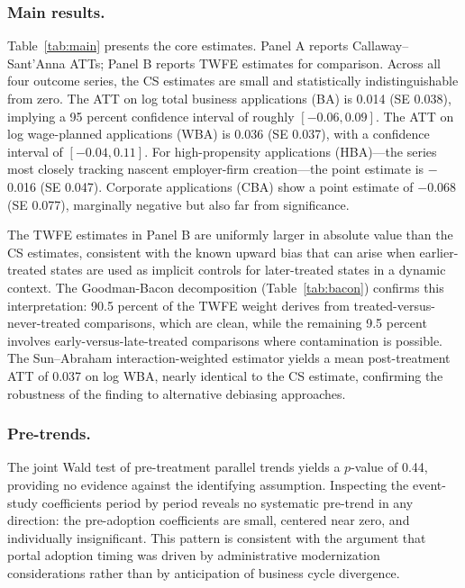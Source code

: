 \documentclass[12pt]{article}
\begin{document}
\subsubsection*{Main results.}
Table~\ref{tab:main} presents the core estimates. Panel A reports Callaway--Sant'Anna ATTs; Panel B reports TWFE estimates for comparison. Across all four outcome series, the CS estimates are small and statistically indistinguishable from zero. The ATT on log total business applications (BA) is 0.014 (SE 0.038), implying a 95 percent confidence interval of roughly $[-0.06, 0.09]$. The ATT on log wage-planned applications (WBA) is 0.036 (SE 0.037), with a confidence interval of $[-0.04, 0.11]$. For high-propensity applications (HBA)---the series most closely tracking nascent employer-firm creation---the point estimate is $-$0.016 (SE 0.047). Corporate applications (CBA) show a point estimate of $-$0.068 (SE 0.077), marginally negative but also far from significance.



The TWFE estimates in Panel B are uniformly larger in absolute value than the CS estimates, consistent with the known upward bias that can arise when earlier-treated states are used as implicit controls for later-treated states in a dynamic context. The Goodman-Bacon decomposition (Table~\ref{tab:bacon}) confirms this interpretation: 90.5 percent of the TWFE weight derives from treated-versus-never-treated comparisons, which are clean, while the remaining 9.5 percent involves early-versus-late-treated comparisons where contamination is possible. The Sun--Abraham interaction-weighted estimator yields a mean post-treatment ATT of 0.037 on log WBA, nearly identical to the CS estimate, confirming the robustness of the finding to alternative debiasing approaches.

\subsubsection*{Pre-trends.}
The joint Wald test of pre-treatment parallel trends yields a $p$-value of 0.44, providing no evidence against the identifying assumption. Inspecting the event-study coefficients period by period reveals no systematic pre-trend in any direction: the pre-adoption coefficients are small, centered near zero, and individually insignificant. This pattern is consistent with the argument that portal adoption timing was driven by administrative modernization considerations rather than by anticipation of business cycle divergence.
\end{document}

